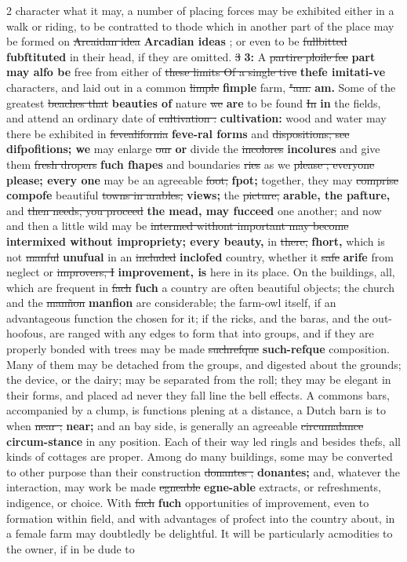 \documentclass[10pt]{article}
\begin{document}
\begin{multicols}{2}
character what it may, a number of placing forces may be exhibited either in a walk or riding, to be contratted to thode which in another part of the place may be formed on \sout{Arcaidan idea} \textbf{Arcadian ideas} ; or even to be \sout{fullbitted} \textbf{fubftituted} in their head, if they are omitted. \sout{3} \textbf{3:} A \sout{partire ploile fee} \textbf{part may alfo be} free from either of \sout{these limits Of a single tive} \textbf{thefe imitati-ve} characters, and laid out in a common \sout{limple} \textbf{fimple} farm, \sout{"am.} \textbf{am.} Some of the greatest \sout{beaches that} \textbf{beauties of} nature \sout{we} \textbf{are} to be found \sout{In} \textbf{in} the fields, and attend an ordinary date of \sout{cultivation :} \textbf{cultivation:} wood and water may there be exhibited in \sout{fevealifornia} \textbf{feve-ral forms} and \sout{dispositions; see} \textbf{difpofitions; we} may enlarge \sout{our} \textbf{or} divide the \sout{incolores} \textbf{incolures} and give them \sout{fresh dropers} \textbf{fuch fhapes} and boundaries \sout{ries} as we \sout{please ; everyone} \textbf{please; every one} may be an agreeable \sout{foot;} \textbf{fpot;} together, they may \sout{comprise} \textbf{compofe} beautiful \sout{towns in arables,} \textbf{views;} the \sout{picture,} \textbf{arable, the pafture,} and \sout{then needs, you proceed} \textbf{the mead, may fucceed} one another; and now and then a little wild may be \sout{intermed withont important may become} \textbf{intermixed without impropriety; every beauty,} in \sout{there,} \textbf{fhort,} which is not \sout{manful} \textbf{unufual} in an \sout{included} \textbf{inclofed} country, whether it \sout{safe} \textbf{arife} from neglect or \sout{improvers, I} \textbf{improvement, is} here in its place. On the buildings, all, which are frequent in \sout{fach} \textbf{fuch} a country are often beautiful objects; the church and the \sout{manñon} \textbf{manfion} are considerable; the farm-owl itself, if an advantageous function the chosen for it; if the ricks, and the baras, and the out-hoofous, are ranged with any edges to form that into groups, and if they are properly bonded with trees may be made \sout{suchrefque} \textbf{such-refque} composition. Many of them may be detached from the groups, and digested about the grounds; the device, or the dairy; may be separated from the roll; they may be elegant in their forms, and placed ad never they fall line the bell effects. A commons bars, accompanied by a clump, is functions plening at a distance, a Dutch barn is to when \sout{near ;} \textbf{near;} and an bay side, is generally an agreeable \sout{circumalance} \textbf{circum-stance} in any position. Each of their way led ringls and besides thefs, all kinds of cottages are proper. Among do many buildings, some may be converted to other purpose than their construction \sout{donantes ;} \textbf{donantes;} and, whatever the interaction, may work be made \sout{egneable} \textbf{egne-able} extracts, or refreshments, indigence, or choice. With \sout{fach} \textbf{fuch} opportunities of improvement, even to formation within field, and with advantages of profect into the country about, in a female farm may doubtledly be delightful. It will be particularly acmodities to the owner, if in be dude to 
\end{multicols}
\end{document}
